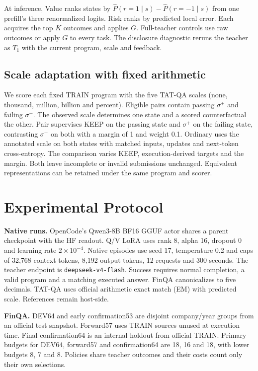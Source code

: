 \documentclass[10pt,letterpaper,conference]{IEEEtran}
\begin{document}
At inference, Value ranks states by \(\widehat P(r=1\mid s)-\widehat P(r=-1\mid s)\) from one prefill's three renormalized logits. Risk ranks by predicted local error. Each acquires the top \(K\) outcomes and applies \(G\). Full-teacher controls use raw outcomes or apply \(G\) to every task. The disclosure diagnostic reruns the teacher as \(T_1\) with the current program, scale and feedback.

\subsection{Scale adaptation with fixed arithmetic}\label{scale-adaptation-with-fixed-arithmetic}

We score each fixed TRAIN program with the five TAT-QA scales (none, thousand, million, billion and percent). Eligible pairs contain passing \(\sigma^+\) and failing \(\sigma^-\). The observed scale determines one state and a scored counterfactual the other. Pair supervises KEEP on the passing state and \(\sigma^+\) on the failing state, contrasting \(\sigma^-\) on both with a margin of 1 and weight 0.1. Ordinary uses the annotated scale on both states with matched inputs, updates and next-token cross-entropy. The comparison varies KEEP, execution-derived targets and the margin. Both leave incomplete or invalid submissions unchanged. Equivalent representations can be retained under the same program and scorer.

\section{Experimental Protocol}\label{experimental-protocol}

\textbf{Native runs.} OpenCode's Qwen3-8B BF16 GGUF actor shares a parent checkpoint with the HF readout. Q/V LoRA uses rank 8, alpha 16, dropout 0 and learning rate \(2\times10^{-4}\). Native episodes use seed 17, temperature 0.2 and caps of 32,768 context tokens, 8,192 output tokens, 12 requests and 300 seconds. The teacher endpoint is \texttt{deepseek-v4-flash}. Success requires normal completion, a valid program and a matching executed answer. FinQA canonicalizes to five decimals. TAT-QA uses official arithmetic exact match (EM) with predicted scale. References remain host-side.

\textbf{FinQA.} DEV64 and early confirmation53 are disjoint company/year groups from an official test snapshot. Forward57 uses TRAIN sources unused at execution time. Final confirmation64 is an internal holdout from official TRAIN. Primary budgets for DEV64, forward57 and confirmation64 are 18, 16 and 18, with lower budgets 8, 7 and 8. Policies share teacher outcomes and their costs count only their own selections.
\end{document}
